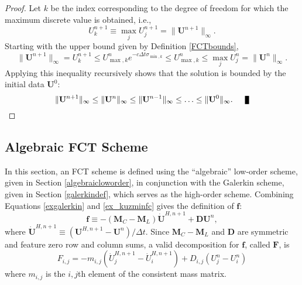 \begin{proof}
   Let $k$ be the index corresponding to the degree of freedom for which
   the maximum discrete value is obtained, i.e.,
   \[
      U_k^{n+1}\equiv\max\limits_j U_j^{n+1}=\|\mathbf{U}^{n+1}\|_\infty.
   \]
   Starting with the upper bound given by Definition \ref{FCTbounds},
   \[
      \|\mathbf{U}^{n+1}\|_\infty = U_k^{n+1} \le
      U_{\max,k}^n e^{-c\Delta t\sigma_{\min,k}} \le
      U_{\max,k}^n \le
      \max\limits_j U_j^n = \|\mathbf{U}^{n}\|_\infty.
   \]
   Applying this inequality recursively shows that the solution is bounded
   by the initial data $\mathbf{U}^0$:
   \[
      \|\mathbf{U}^{n+1}\|_\infty\le
      \|\mathbf{U}^{n}\|_\infty\le
      \|\mathbf{U}^{n-1}\|_\infty\le\ldots\le
      \|\mathbf{U}^{0}\|_\infty.\qed
   \]
\end{proof}
\subsection{Algebraic FCT Scheme}\label{algebraicFCT}
In this section, an FCT scheme is defined using the ``algebraic'' low-order
scheme, given in Section \ref{algebraicloworder}, in conjunction with the
Galerkin scheme, given in Section \ref{galerkindef}, which serves as the
high-order scheme. Combining Equations \eqref{exgalerkin} and
\eqref{ex_kuzminfc} gives the definition of $\mathbf{f}$:
\begin{equation}\label{ex_kuzminFdef}
   \mathbf{f} \equiv -(\mathbf{M}_C-\mathbf{M}_L)\mathbf{\dot{U}}^{H,n+1}
      +\mathbf{D}\mathbf{U}^n,
\end{equation}
where $\mathbf{\dot{U}}^{H,n+1} \equiv (\mathbf{U}^{H,n+1} - \mathbf{U}^n)/\Delta t$.
Since $\mathbf{M}_C-\mathbf{M}_L$ and $\mathbf{D}$ are symmetric
and feature zero row and column sums, a valid decomposition for $\mathbf{f}$,
called $\mathbf{F}$, is
\begin{equation}
   F_{i,j} = -m_{i,j}(\dot{U}^{H,n+1}_j - \dot{U}^{H,n+1}_i)
   + D_{i,j}(U^n_j - U^n_i)
\end{equation}
where $m_{i,j}$ is the $i,j$th element of the consistent mass matrix.
